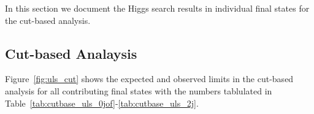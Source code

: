 In this section we document the Higgs search results in individual final states for the cut-based analysis.  

\subsection{Cut-based Analaysis}

Figure~\ref{fig:uls_cut} shows the expected and observed limits in the cut-based analysis 
for all contributing final states with the numbers tablulated in Table~\ref{tab:cutbase_uls_0jof}-\ref{tab:cutbase_uls_2j}. 

\begin{figure}[!hbtp]
\centering
{}
\centering
{} \\
\end{figure}
